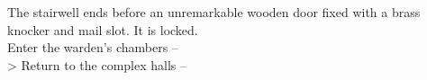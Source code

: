 The stairwell ends before an unremarkable wooden door fixed with a brass knocker and mail slot. It is locked.\\

 Enter the warden's chambers -- \\
> Return to the complex halls -- 